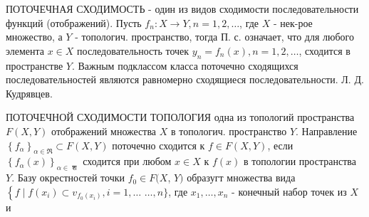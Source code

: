 \documentclass[10pt]{article}
\begin{document}
ПОТОЧЕЧНАЯ СХОДИМОСТЬ - один из видов сходимости последовательности функций (отображений). Пусть $f_{n}: X \rightarrow Y, n=1,2, \ldots$, где $X$ - нек-рое множество, а $Y$ - топологич. пространство, тогда П. с. означает, что для любого элемента $x \in X$ последовательность точек $y_{n}=f_{n}(x), n=1,2, \ldots$, сходится в пространстве $Y$. Важным подклассом класса поточечно сходящихся последовательностей являются равномерно сходящиеся последовательности. Л. Д. Кудрявцев.



ПОТОЧЕЧНОЙ СХОДИМОСТИ ТОПОЛОГИЯ одна из топологий пространства $F(X, Y)$ отображений множества $X$ в топологич. пространство $Y$. Направление $\left\{f_{\alpha}\right\}_{\alpha \in \Re} \subset F(X, Y)$ поточечно сходится к $f \in F(X, Y)$, если $\left\{f_{\alpha}(x)\right\}_{\alpha \in \text { श }}$ сходится при любом $x \in X$ к $f(x)$ в топологии пространства $Y$. Базу окрестностей точки $f_{0} \in F(X$, $Y)$ образугт множества вида $\left\{f \mid f\left(x_{i}\right) \subset v_{f_{0}\left(x_{i}\right)}, i=1, \ldots\right.$ $\ldots, n\}$, где $x_{1}, \ldots, x_{n}$ - конечный набор точек из $X$ и
\end{document}
